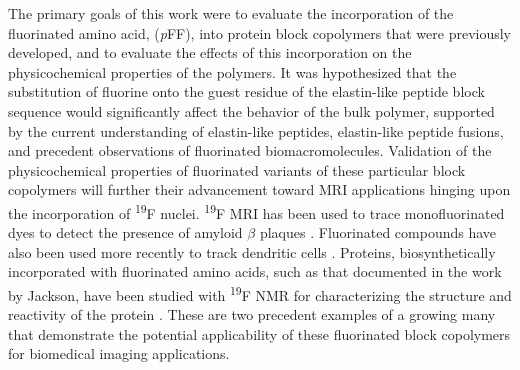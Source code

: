 \begin{refsection}
The primary goals of this work were to evaluate the incorporation of the
fluorinated amino acid,  (\emph{p}FF), into
protein block copolymers that were previously developed, and to evaluate the
effects of this incorporation on the physicochemical properties of the polymers.
It was hypothesized that the substitution of fluorine onto the guest residue of
the elastin-like peptide block sequence would significantly affect the behavior
of the bulk polymer, supported by the current understanding of elastin-like
peptides, elastin-like peptide fusions, and precedent observations of
fluorinated biomacromolecules. Validation of the physicochemical properties of
fluorinated variants of these particular block copolymers will further their
advancement toward MRI applications hinging upon the incorporation of
\textsuperscript{19}F nuclei. \textsuperscript{19}F MRI has been used to trace
monofluorinated dyes to detect the presence of amyloid ${\beta}$ plaques
.\cite{Higuchi2005} Fluorinated compounds have also been used
more recently to track dendritic cells  .\cite{Bonetto2010}
Proteins, biosynthetically incorporated with fluorinated amino acids, such as
that documented in the work by Jackson,\cite{Jackson2007} have been studied with
\textsuperscript{19}F NMR for characterizing the structure and reactivity of the
protein .  These are two precedent examples of a growing many
that demonstrate the potential applicability of these fluorinated block
copolymers for biomedical imaging applications.




\end{refsection}
